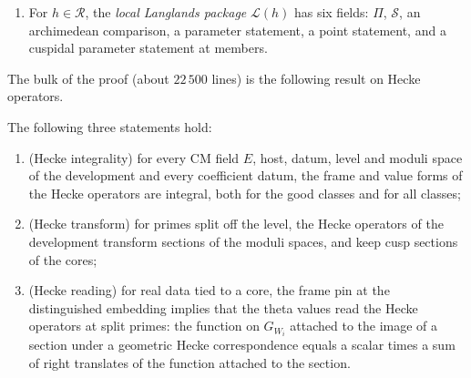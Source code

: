 \begin{definition}
\begin{enumerate}[label=(\alph*)]
dimension two, tame local theory, local finiteness, local Tate duality, local Euler characteristic, global finiteness and Euler characteristic,
unramified orthogonality, archimedean signature matching, Greenberg--Wiles, ray characters, Chebotarev for degree one primes, toric denominators,
the five series and Hecke fields of $\mathcal S$, finiteness of automorphic forms on $\GL_n$, two statements on Galois representations attached to
cuspidal representations, de Rham $\Rightarrow$ potentially semistable, and the local Bloch--Kato conclusion at all primes.
\item For $h\in\mathcal R$, the \emph{local Langlands package} $\mathcal L(h)$ has six fields: $\Pi$, $\mathcal S$, an archimedean comparison, a
parameter statement, a point statement, and a cuspidal parameter statement at members.
\end{enumerate}
\end{definition}

The bulk of the proof (about $22\,500$ lines) is the following result on Hecke operators.

\begin{proposition}\label{pf:liftinj:hecke}
The following three statements hold:
\begin{enumerate}[label=(\alph*)]
\item (Hecke integrality) for every CM field $E$, host, datum, level and moduli space of the development and every coefficient datum, the frame
and value forms of the Hecke operators are integral, both for the good classes and for all classes;
\item (Hecke transform) for primes split off the level, the Hecke operators of the development transform sections of the moduli spaces, and keep
cusp sections of the cores;
\item (Hecke reading) for real data tied to a core, the frame pin at the distinguished embedding implies that the theta values read the
Hecke operators at split primes: the function on $G_{W_i}$ attached to the image of a section under a geometric Hecke correspondence equals a
scalar times a sum of right translates of the function attached to the section.
\end{enumerate}
\end{proposition}

